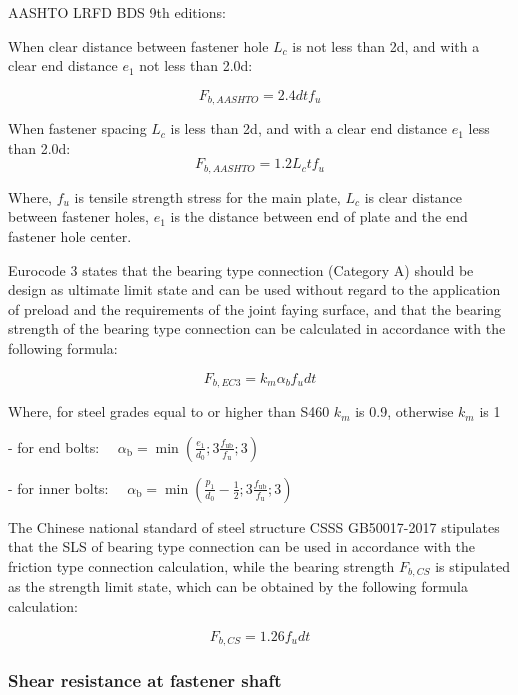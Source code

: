 AASHTO LRFD BDS 9th editions:

When clear distance between fastener hole $L_c$ is not less than 2d, and with a clear end distance $e_1$ not less than 2.0d:

\begin{equation}
    F_{b,AASHTO} = 2.4dtf_u
\end{equation}

When fastener spacing $L_c$ is less than 2d, and with a clear end distance $e_1$ less than 2.0d:
\begin{equation}
    F_{b,AASHTO} = 1.2L_ctf_u
\end{equation}

Where, $f_u$ is tensile strength stress for the main plate, $L_c$ is clear distance between fastener holes, $e_1$ is the distance between end of plate and the end fastener hole center.

Eurocode 3 \cite{eurocode3-21} states that the bearing type connection (Category A) should be design as ultimate limit state \cite{ec1993-1-1-2020} and can be used without regard to the application of preload and the requirements of the joint faying surface, and that the bearing strength of the bearing type connection can be calculated in accordance with the following formula:

\begin{equation}
    F_{b,EC3} = k_m\alpha_bf_udt
\end{equation}

Where, for steel grades equal to or higher than S460 $k_m$ is 0.9, otherwise $k_m$ is 1

- for end bolts: $\quad \alpha_{\mathrm{b}}=\min \left(\frac{e_1}{d_0} ; 3 \frac{f_{\mathrm{ub}}}{f_{\mathrm{u}}} ; 3\right)$

- for inner bolts: $\quad \alpha_{\mathrm{b}}=\min \left(\frac{p_1}{d_0}-\frac{1}{2} ; 3 \frac{f_{\mathrm{ub}}}{f_{\mathrm{u}}} ; 3\right)$

The Chinese national standard of steel structure \ac{CSSS} GB50017-2017 \cite{gb50017-2017} stipulates that the SLS of bearing type connection can be used in accordance with the friction type connection calculation, while the bearing strength $F_{b,CS}$ is stipulated as the strength limit state, which can be obtained by the following formula calculation:

\begin{equation}
    F_{b,CS}=1.26 f_u dt
\end{equation}

\subsubsection{Shear resistance at fastener shaft}


